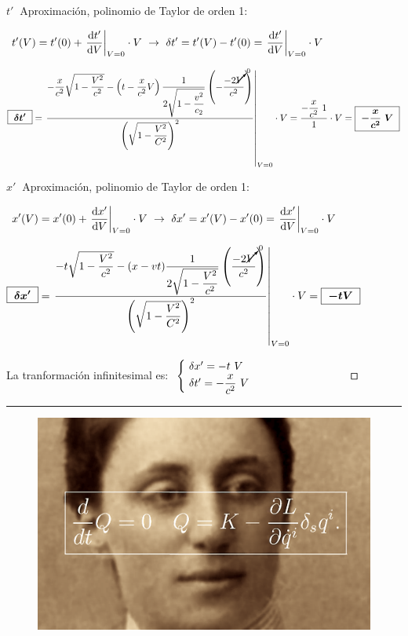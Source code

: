 $t'\ $ Aproximación, polinomio de Taylor de orden 1: 

$\ \displaystyle t'(V)=t'(0)+\eval{\dv{t'}{V}}_{V=0} \cdot V \ \to \ \var t'=t'(V)-t'(0)=\eval{\dv{t'}{V}}_{V=0} \cdot V$

$\boxed{ \  \boldsymbol{ \var t' } \ }=\eval{\dfrac{ -\dfrac x {c^2} {\sqrt{1-\dfrac{V^2}{c^2}}} - \left( t-\dfrac{x}{c^2} V \right) \dfrac {1}{2\sqrt{1-\dfrac{v^2}{c_2}}} \left(-\dfrac{-2\cancelto{0}{ V} }{c^2} \right)  }{{ \left(\sqrt{1-\dfrac {V^2}{C^2}}\right)^2 }} }_{V=0} \cdot V = \dfrac{-\dfrac x{c^2} \ 1  }{1}\cdot V = \boxed{ \  \boldsymbol{-\dfrac x{c^2} \ V}  \ } $

$x'\ $ Aproximación, polinomio de Taylor de orden 1: 

$\ \displaystyle x'(V)=x'(0)+\eval{\dv{x'}{V}}_{V=0} \cdot V \ \to \ \var x'=x'(V)-x'(0)=\eval{\dv{x'}{V}}_{V=0} \cdot V$


$\boxed{ \ \boldsymbol{ \var x' } \ } =
\eval{
\dfrac{
-t\sqrt{1-\dfrac{V^2}{c^2} } - (x-vt) \dfrac 1{2\sqrt{1-\dfrac{V^2}{c^2}}} \left( \dfrac{-2 \cancelto{0}{V}}{c^2}  \right)
}{ \left(\sqrt{1-\dfrac {V^2}{C^2}}\right)^2 }
}_{V=0} \cdot V = \boxed{ \ \boldsymbol { -tV} \ }    $

\begin{flushright} La tranformación infinitesimal es: $\ \begin{cases} \ \var x'=-t \ V \\ \ \var t'=-\dfrac x{c^2} \ V \end{cases} \qquad \qquad \qquad \qquad \boldsymbol{ \Box } \ $ \end{flushright}

\color{Black}
\begin{center}\rule{250pt}{0.1pt}\end{center}

\vspace{5mm}

\begin{figure}[H]
	\centering
	\includegraphics[width=.75\textwidth]{imagenes/img15-05.png}
\end{figure}